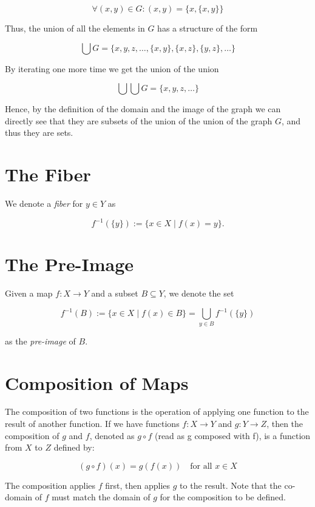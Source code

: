 \[
	\forall (x,y) \in G: (x,y) = \{x, \{x, y\}\}
\]

Thus, the union of all the elements in \(G\) has a structure of the form

\[
	\bigcup G = \{x, y, z, \dots, \{x, y\}, \{x, z\}, \{y, z\}, \dots\}
\]

By iterating one more time we get the union of the union

\[
	\bigcup \bigcup G = \{x, y, z, \dots\}
\]

Hence, by the definition of the domain and the image of the graph we can directly see that they are subsets of the union of the union of the graph
\(G\), and thus they are sets.

\QED

\section{The Fiber}

We denote a \emph{fiber} for \(y \in Y\) as

\[
	f^{-1}(\{y\}) := \{x \in X \mid f(x) = y\}.
\]

\section{The Pre-Image}

Given a map \(f: X \to Y\) and a subset \(B \subseteq Y\), we denote the set

\[
	f^{-1}(B) := \{x \in X \mid f(x) \in B\} = \bigcup_{y \in B} f^{-1}(\{y\})
\]

as the \emph{pre-image} of \(B\).

\section{Composition of Maps}

The composition of two functions is the operation of applying one function to the result of another
function. If we have functions \(f: X \to Y\) and \(g: Y \rightarrow Z\), then the composition of \(g\)
and \(f\), denoted as \(g \circ f\) (read as g composed with f), is a function from \(X\) to \(Z\) defined
by:

\[
	(g \circ f)(x) = g(f(x)) \quad \text{for all } x \in X
\]

The composition applies \(f\) first, then applies \(g\) to the result.
Note that the co-domain of \(f\) must match the domain of \(g\) for the composition to be defined.

